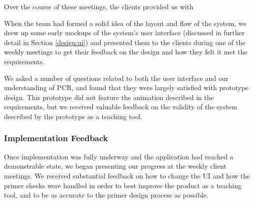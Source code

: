 Over the course of these meetings, the clients provided us with  

When the team had formed a solid idea of the layout and flow of the
system, we drew up some early mockups of the system's user interface
(discussed in further detail in Section \ref{design:ui}) and presented
them to the clients during 
one of the weekly meetings %
to get their feedback on the design and how they felt it met the 
requirements. 

We asked a number of questions related to both the user
interface and our understanding of PCR, and found that they were largely
satisfied with prototype design. This prototype did not feature the
animation described in the requirements, but we received valuable feedback
on the validity of the system described by the prototype as a teaching
tool.


\subsubsection{Implementation Feedback}
Once implementation was fully underway and the application had reached
a demonstrable state, we began presenting our progress at the weekly client
meetings. We received substantial feedback on how to change the UI and 
how the primer checks were handled in order
to best improve the product as a teaching tool, and to be as accurate to
the primer design process as possible.  
